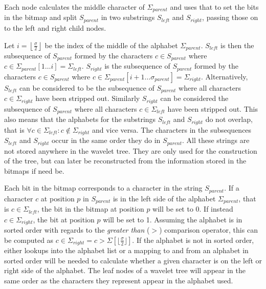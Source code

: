 Each node calculates the middle character of $\Sigma_{\mathit{parent}}$ and uses that to set the bits in the bitmap and split $S_{\mathit{parent}}$ in two substrings $S_{\mathit{left}}$ and $S_{\mathit{right}}$, passing those on to the left and right child nodes.

Let $i = \left\lfloor\frac{\sigma}{2}\right\rfloor$ be the index of the middle of the alphabet $\Sigma_{\mathit{parent}}$.
$S_{\mathit{left}}$ is then the subsequence of $S_{\mathit{parent}}$ formed by the characters $c \in S_{\mathit{parent}}$ where $c \in \Sigma_{\mathit{parent}}[1 \ldots i] = \Sigma_{\mathit{left}}$.
$S_{\mathit{right}}$ is the subsequence of $S_{\mathit{parent}}$ formed by the characters $c \in S_{\mathit{parent}}$ where $c \in \Sigma_{\mathit{parent}}[i+1 \ldots \sigma_{\mathit{parent}}] = \Sigma_{\mathit{right}}$.
Alternatively, $S_{\mathit{left}}$ can be considered to be the subsequence of $S_{\mathit{parent}}$ where all characters $c \in \Sigma_{\mathit{right}}$ have been stripped out. Similarly $S_{\mathit{right}}$ can be considered the subsequence of $S_{\mathit{parent}}$ where all characters $c \in \Sigma_{\mathit{left}}$ have been stripped out.
This also means that the alphabets for the substrings $S_{\mathit{left}}$ and $S_{\mathit{right}}$ do not overlap, that is $\forall c \in \Sigma_{\mathit{left}}: c \notin \Sigma_{\mathit{right}}$ and vice versa.
The characters in the subsequences $S_{\mathit{left}}$ and $S_{\mathit{right}}$ occur in the same order they do in $S_{\mathit{parent}}$.
All these strings are not stored anywhere in the wavelet tree.
They are only used for the construction of the tree, but can later be reconstructed from the information stored in the bitmaps if need be.

Each bit in the bitmap corresponds to a character in the string $S_{\mathit{parent}}$.
If a character $c$ at position $p$ in $S_{\mathit{parent}}$ is in the left side of the alphabet $\Sigma_{\mathit{parent}}$, that is $c \in \Sigma_{\mathit{left}}$, the bit in the bitmap at position $p$ will be set to 0.
If instead $c \in \Sigma_{\mathit{right}}$, the bit at position $p$ will be set to 1.
Assuming the alphabet is in sorted order with regards to the \textit{greater than} ($>$) comparison operator, this can be computed as $c \in \Sigma_{\mathit{right}} = c > \Sigma[\lfloor\frac{\sigma}{2}\rfloor]$.
If the alphabet is not in sorted order, either lookups into the alphabet list or a mapping to and from an alphabet in sorted order will be needed to calculate whether a given character is on the left or right side of the alphabet.
The leaf nodes of a wavelet tree will appear in the same order as the characters they represent appear in the alphabet used.

